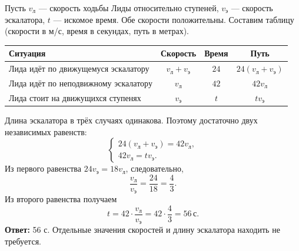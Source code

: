 \documentclass[a4paper,12pt]{article}
\newcommand{\unit}[1]{\,\text{#1}}
\newcommand{\ans}[1]{\textbf{Ответ:} #1.}
\begin{document}
Пусть $v_\text{л}$ --- скорость ходьбы Лиды относительно ступеней, $v_\text{э}$ --- скорость эскалатора, $t$ --- искомое время. Обе скорости положительны. Составим таблицу (скорости в м/с, время в секундах, путь в метрах).
\begin{center}
\renewcommand{\arraystretch}{1.2}
\begin{tabularx}{\linewidth}{@{}Xccc@{}}
\toprule
Ситуация & Скорость & Время & Путь \\
\midrule
Лида идёт по движущемуся эскалатору & $v_\text{л}+v_\text{э}$ & $24$ & $24(v_\text{л}+v_\text{э})$\\
Лида идёт по неподвижному эскалатору & $v_\text{л}$ & $42$ & $42v_\text{л}$\\
Лида стоит на движущихся ступенях & $v_\text{э}$ & $t$ & $tv_\text{э}$\\
\bottomrule
\end{tabularx}
\end{center}
Длина эскалатора в трёх случаях одинакова. Поэтому достаточно двух независимых равенств:
\[
 \begin{cases}
 24(v_\text{л}+v_\text{э})=42v_\text{л},\\
 42v_\text{л}=tv_\text{э}.
 \end{cases}
\]
Из первого равенства $24v_\text{э}=18v_\text{л}$, следовательно,
\[
 \frac{v_\text{л}}{v_\text{э}}=\frac{24}{18}=\frac43.
\]
Из второго равенства получаем
\[
 t=42\cdot\frac{v_\text{л}}{v_\text{э}}=42\cdot\frac43=56\unit{с}.
\]
\ans{56 с} Отдельные значения скоростей и длину эскалатора находить не требуется.

\clearpage
\end{document}
